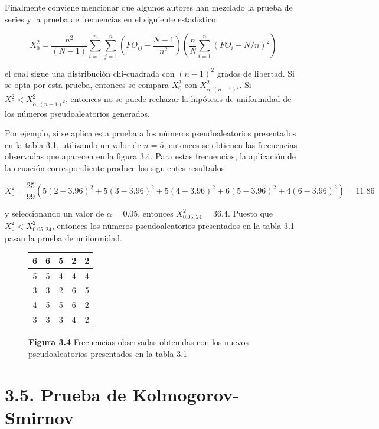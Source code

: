\documentclass[11pt,letterpaper]{report}
\begin{document}
Finalmente conviene mencionar que algunos autores han mezclado la
prueba de series y la prueba de frecuencias en el siguiente estadístico:

\begin{equation}
X_0^2 = \frac{n^2}{(N-1)} \sum_{i=1}^{n} \sum_{j=1}^{n} \left( FO_{ij} - \frac{N-1}{n^2} \right) \left( \frac{n}{N} \sum_{i=1}^{n} (FO_i - N/n)^2 \right)
\end{equation}

el cual sigue una distribución chi-cuadrada con $(n-1)^2$ grados de
libertad. Si se opta por esta prueba, entonces se compara $X_0^2$ con
$X^2_{\alpha,(n-1)^2}$. Si $X_0^2 < X^2_{\alpha,(n-1)^2}$, entonces no
se puede rechazar la hipótesis de uniformidad de los números
pseudoaleatorios generados.

Por ejemplo, si se aplica esta prueba a los números pseudoaleatorios
presentados en la tabla 3.1, utilizando un valor de $n=5$, entonces se
obtienen las frecuencias observadas que aparecen en la figura 3.4. Para
estas frecuencias, la aplicación de la ecuación correspondiente produce
los siguientes resultados:

\begin{equation}
X_0^2 = \frac{25}{99}\left( 5(2-3.96)^2 + 5(3-3.96)^2 + 5(4-3.96)^2 + 6(5-3.96)^2 + 4(6-3.96)^2 \right) = 11.86
\end{equation}

y seleccionando un valor de $\alpha=0.05$, entonces $X^2_{0.05,24} =
36.4$. Puesto que $X_0^2 < X^2_{0.05,24}$, entonces los números
pseudoaleatorios presentados en la tabla 3.1 pasan la prueba de
uniformidad.

\begin{figure}[H]
\centering
\caption*{\textbf{Figura 3.4} Frecuencias observadas obtenidas con los nuevos pseudoaleatorios presentados en la tabla 3.1}
\begin{tabular}{|c|c|c|c|c|}
\hline
6 & 6 & 5 & 2 & 2 \\
\hline
5 & 5 & 4 & 4 & 4 \\
\hline
3 & 3 & 2 & 6 & 5 \\
\hline
4 & 5 & 5 & 6 & 2 \\
\hline
3 & 3 & 3 & 4 & 2 \\
\hline
\end{tabular}
\end{figure}

\section*{3.5. Prueba de Kolmogorov-Smirnov}
\end{document}
